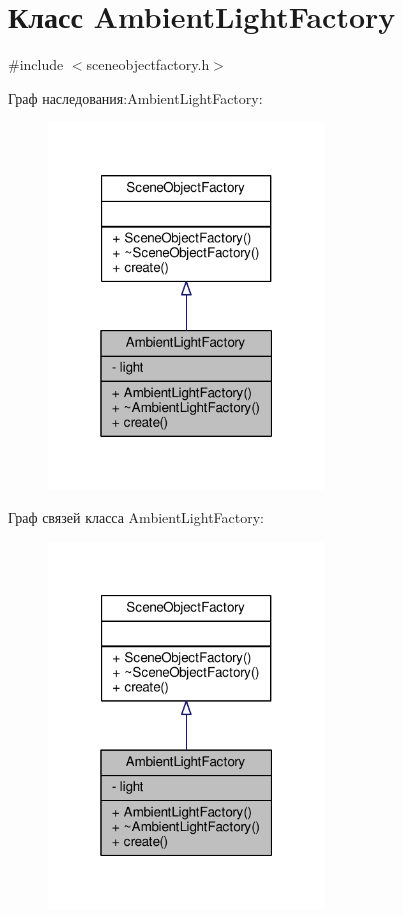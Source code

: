 \hypertarget{class_ambient_light_factory}{}\section{Класс Ambient\+Light\+Factory}
\label{class_ambient_light_factory}


{\ttfamily \#include $<$sceneobjectfactory.\+h$>$}



Граф наследования\+:Ambient\+Light\+Factory\+:
\nopagebreak
\begin{figure}[H]
\begin{center}
\leavevmode
\includegraphics[width=208pt]{d9/d29/class_ambient_light_factory__inherit__graph}
\end{center}
\end{figure}


Граф связей класса Ambient\+Light\+Factory\+:
\nopagebreak
\begin{figure}[H]
\begin{center}
\leavevmode
\includegraphics[width=208pt]{d3/d90/class_ambient_light_factory__coll__graph}
\end{center}
\end{figure}
